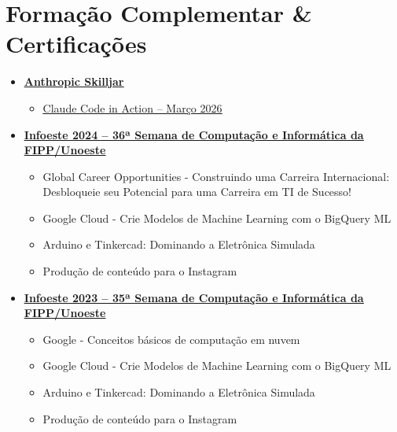 \documentclass[letterpaper,11pt]{article}
\begin{document}
\section{Formação Complementar \& Certificações}
\begin{itemize}[leftmargin=0.15in, label={}]

    \item \small \textbf{\href{https://anthropic.skilljar.com/}{\underline{Anthropic Skilljar}}}
    \begin{itemize}[itemsep=-5pt, parsep=3pt]
        \item\small \href{https://verify.skilljar.com/c/26xevfmxt6xn}{\underline{Claude Code in Action -- Março 2026}}
    \end{itemize}


    \item \small \textbf{\href{https://raw.githubusercontent.com/elvitin/curriculo/main/certs/infoeste/Certificado2024.pdf}{\underline{Infoeste 2024 -- 36ª Semana de Computação e Informática da FIPP/Unoeste}}}
    \begin{itemize}[itemsep=-5pt, parsep=3pt]
        \item\small Global Career Opportunities - Construindo uma Carreira Internacional: Desbloqueie seu Potencial para uma Carreira em TI de Sucesso!
        \item\small Google Cloud - Crie Modelos de Machine Learning com o BigQuery ML
        \item\small Arduino e Tinkercad: Dominando a Eletrônica Simulada
        \item\small Produção de conteúdo para o Instagram
    \end{itemize}

    \item \small \textbf{\href{https://raw.githubusercontent.com/elvitin/curriculo/main/certs/infoeste/Certificado2023.pdf}{\underline{Infoeste 2023 -- 35ª Semana de Computação e Informática da FIPP/Unoeste}}}
    \begin{itemize}[itemsep=-5pt, parsep=3pt]
        \item\small Google - Conceitos básicos de  computação em nuvem
        \item\small Google Cloud - Crie Modelos de Machine Learning com o BigQuery ML
        \item\small Arduino e Tinkercad: Dominando a Eletrônica Simulada
        \item\small Produção de conteúdo para o Instagram
    \end{itemize}


\end{itemize}
\end{document}
